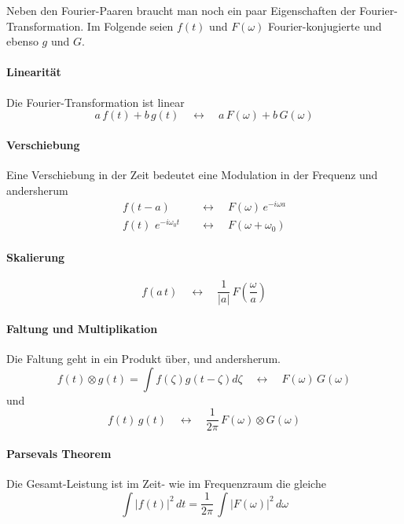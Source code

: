 Neben den Fourier-Paaren braucht man noch ein paar Eigenschaften der Fourier-Transformation. Im Folgende seien  $f(t)$ und $F(\omega)$ Fourier-konjugierte  und ebenso $g$ und $G$.

\paragraph{Linearität} Die Fourier-Transformation ist linear
\begin{equation}
a \, f(t) + b \, g(t) \quad \leftrightarrow \quad 
a \, F(\omega) + b \, G(\omega) 
\end{equation}

\paragraph{Verschiebung}  Eine Verschiebung in der Zeit bedeutet eine Modulation in der Frequenz und andersherum
\begin{align}
 f(t - a) & \quad \leftrightarrow \quad 
F(\omega) \, e^{-i \omega a} \\
 f(t) \, \, e^{-i \omega_0 t} &  \quad \leftrightarrow \quad 
F(\omega + \omega_0)  
\end{align}

\paragraph{Skalierung}  
\begin{equation}
 f( a \, t)  \quad \leftrightarrow \quad 
\frac{1}{|a|} \, F \left( \frac{\omega}{a} \right)  
\end{equation}


\paragraph{Faltung und Multiplikation} Die Faltung geht in ein Produkt über, und andersherum.
\begin{equation}
 f(t) \otimes g(t) = \int f(\zeta) g(t- \zeta) d\zeta 
 \quad \leftrightarrow \quad 
 F(\omega) \, G(\omega)
\end{equation}
und
\begin{equation}
 f(t) \,  g(t) 
 \quad \leftrightarrow \quad 
\frac{1}{2 \pi} \,  F(\omega) \otimes G(\omega)
\end{equation}

\paragraph{Parsevals Theorem} Die Gesamt-Leistung ist im Zeit- wie im Frequenzraum die gleiche
\begin{equation}
 \int |f(t) |^2 \, dt = \frac{1}{2 \pi} \, \int | F (\omega ) | ^2 \, d\omega
\end{equation}

